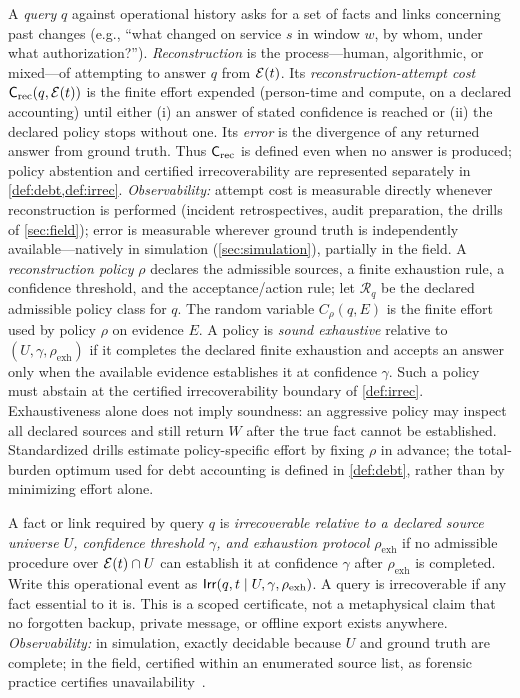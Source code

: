 \begin{definition}
\label{def:rec}
A \emph{query} $q$ against operational history asks for a set of facts and links
concerning past changes (e.g., ``what changed on service $s$ in window $w$, by whom,
under what authorization?''). \emph{Reconstruction} is the process---human,
algorithmic, or mixed---of attempting to answer $q$ from $\mathcal{E}(t)$. Its
\emph{reconstruction-attempt cost} $\mathsf{C}_{\mathrm{rec}}(q, \mathcal{E}(t))$ is the finite effort expended
(person-time and compute, on a declared accounting) until either (i) an answer of
stated confidence is reached or (ii) the declared policy stops without one. Its
\emph{error} is the divergence of any returned
answer from ground truth. Thus $\mathsf{C}_{\mathrm{rec}}$ is defined even when no answer is produced;
policy abstention and certified irrecoverability are represented separately in
\cref{def:debt,def:irrec}. \emph{Observability:} attempt cost is
measurable directly whenever reconstruction is performed (incident retrospectives,
audit preparation, the drills of \cref{sec:field}); error is measurable wherever
ground truth is independently available---natively in simulation
(\cref{sec:simulation}), partially in the field.
A \emph{reconstruction policy} $\rho$ declares the admissible sources, a finite
exhaustion rule, a confidence threshold, and the acceptance/action rule; let
$\mathcal R_q$ be the declared admissible policy class for $q$. The random variable
$C_\rho(q,E)$ is the finite effort used by policy $\rho$ on evidence $E$.
A policy is \emph{sound exhaustive} relative to $(U,\gamma,\rho_{\mathrm{exh}})$
if it completes the declared finite exhaustion and accepts an answer only when the
available evidence establishes it at confidence $\gamma$. Such a policy must
abstain at the certified irrecoverability boundary of \cref{def:irrec}.
Exhaustiveness alone does not imply soundness: an aggressive policy may inspect all
declared sources and still return $W$ after the true fact cannot be established.
Standardized drills estimate policy-specific effort by fixing $\rho$ in advance;
the total-burden optimum used for debt accounting is defined in
\cref{def:debt}, rather than by minimizing effort alone.
\end{definition}

\begin{definition}
\label{def:irrec}
A fact or link required by query $q$ is \emph{irrecoverable relative to a declared
source universe $U$, confidence threshold $\gamma$, and exhaustion protocol
$\rho_{\mathrm{exh}}$} if no admissible procedure over
$\mathcal{E}(t)\cap U$ can establish it at confidence $\gamma$ after
$\rho_{\mathrm{exh}}$ is completed. Write this operational event as
$\mathsf{Irr}(q,t\mid U,\gamma,\rho_{\mathrm{exh}})$. A query is irrecoverable if any fact
essential to it is. This is a scoped certificate, not a metaphysical claim that no
forgotten backup, private message, or offline export exists anywhere.
\emph{Observability:} in simulation, exactly decidable because $U$ and ground truth
are complete; in the field, certified within an enumerated source list, as forensic
practice certifies unavailability~\cite{nist80086,casey2011}.
\end{definition}

